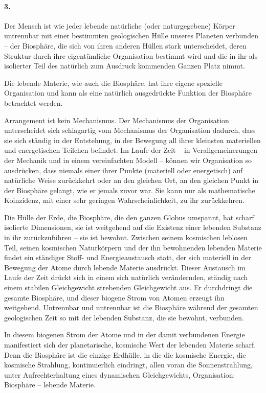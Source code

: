 \documentclass[11pt,a4paper]{book}
\begin{document}
\paragraph{3.}
Der Mensch ist wie jeder lebende natürliche (oder naturgegebene) Körper
untrennbar mit einer bestimmten geologischen Hülle unseres Planeten verbunden
-- der Biosphäre, die sich von ihren anderen Hüllen stark unterscheidet, deren
Struktur durch ihre eigentümliche Organisation bestimmt wird und die in ihr
als isolierter Teil des natürlich zum Ausdruck kommenden Ganzen Platz nimmt.

Die lebende Materie, wie auch die Biosphäre, hat ihre eigene spezielle
Organisation und kann als eine natürlich ausgedrückte Funktion der Biosphäre
betrachtet werden.

Arrangement ist kein Mechanismus. Der Mechanismus der Organisation
unterscheidet sich schlagartig vom Mechanismus der Organisation dadurch, dass
sie sich ständig in der Entstehung, in der Bewegung all ihrer kleinsten
materiellen und energetischen Teilchen befindet. Im Laufe der Zeit -- in
Verallgemeinerungen der Mechanik und in einem vereinfachten Modell -- können
wir Organisation so ausdrücken, dass niemals einer ihrer Punkte (materiell
oder energetisch) auf natürliche Weise zurückkehrt oder an den gleichen Ort,
an den gleichen Punkt in der Biosphäre gelangt, wie er jemals zuvor war. Sie
kann nur als mathematische Koinzidenz, mit einer sehr geringen
Wahrscheinlichkeit, zu ihr zurückkehren.

Die Hülle der Erde, die Biosphäre, die den ganzen Globus umspannt, hat scharf
isolierte Dimensionen, sie ist weitgehend auf die Existenz einer lebenden
Substanz in ihr zurückzuführen -- sie ist bewohnt. Zwischen seinem kosmischen
leblosen Teil, seinen kosmischen Naturkörpern und der ihn bewohnenden lebenden
Materie findet ein ständiger Stoff- und Energieaustausch statt, der sich
materiell in der Bewegung der Atome durch lebende Materie ausdrückt. Dieser
Austausch im Laufe der Zeit drückt sich in einem sich natürlich verändernden,
ständig nach einem stabilen Gleichgewicht strebenden Gleichgewicht aus. Er
durchdringt die gesamte Biosphäre, und dieser biogene Strom von Atomen erzeugt
ihn weitgehend. Untrennbar und untrennbar ist die Biosphäre während der
gesamten geologischen Zeit so mit der lebenden Substanz, die sie bewohnt,
verbunden.

In diesem biogenen Strom der Atome und in der damit verbundenen Energie
manifestiert sich der planetarische, kosmische Wert der lebenden Materie
scharf. Denn die Biosphäre ist die einzige Erdhülle, in die die kosmische
Energie, die kosmische Strahlung, kontinuierlich eindringt, allen voran die
Sonnenstrahlung, unter Aufrechterhaltung eines dynamischen Gleichgewichts,
Organisation: Biosphäre -- lebende Materie.
\end{document}
